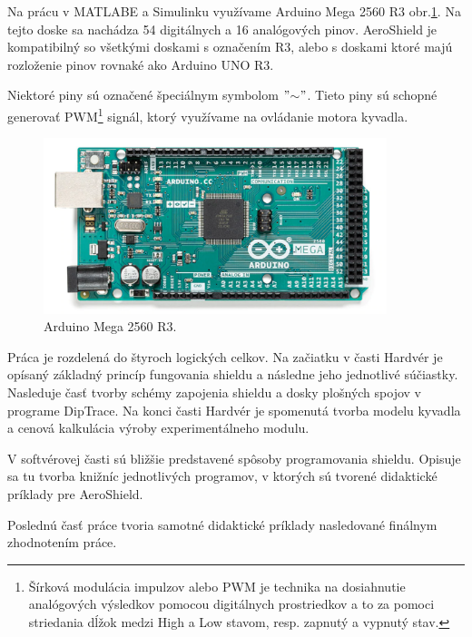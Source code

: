 Na prácu v MATLABE a Simulinku využívame Arduino Mega 2560 R3 obr.\ref{OBRAZOK 1.32}. Na tejto doske sa nachádza 54 digitálnych a 16 analógových pinov. AeroShield je kompatibilný so všetkými doskami s označením R3, alebo s doskami ktoré majú rozloženie pinov rovnaké ako Arduino UNO R3. 

Niektoré piny sú označené špeciálnym symbolom $"$$\sim$$"$. Tieto piny sú schopné generovať PWM\footnote[3]{Šírková modulácia impulzov alebo PWM je technika na dosiahnutie analógových výsledkov pomocou digitálnych prostriedkov a to za pomoci striedania dĺžok medzi High a Low stavom, resp. zapnutý a vypnutý stav.} signál, ktorý využívame na ovládanie motora kyvadla.

\begin{figure}[!tbh]
	\centering
	\includegraphics[width=100mm]{obr/mega.png}
	\caption{{Arduino Mega 2560 R3.\cite{megafoto}}}\label{OBRAZOK 1.32}
\end{figure}

\newpage
Práca je rozdelená do štyroch logických celkov. Na začiatku v časti Hardvér je opísaný základný princíp fungovania shieldu a následne jeho jednotlivé súčiastky. Nasleduje časť tvorby schémy zapojenia shieldu a dosky plošných spojov v programe DipTrace. Na konci časti Hardvér je spomenutá tvorba modelu kyvadla a cenová kalkulácia výroby experimentálneho modulu. 

V softvérovej časti sú bližšie predstavené spôsoby programovania shieldu. Opisuje sa tu tvorba knižníc jednotlivých programov, v ktorých sú tvorené didaktické príklady pre AeroShield.

Poslednú časť práce tvoria samotné didaktické príklady nasledované finálnym zhodnotením práce.




